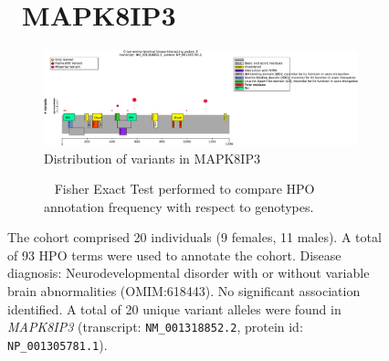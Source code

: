 \begin{figure}[htbp]
    \section*{ MAPK8IP3}
    \centering
    \begin{subfigure}[b]{0.95\textwidth}
    \centering
    \includegraphics[width=\textwidth]{ img/MAPK8IP3_protein_diagram.pdf} 
    \captionsetup{justification=raggedright,singlelinecheck=false}
    \caption{Distribution of variants in MAPK8IP3}
    \end{subfigure}
    
    \vspace{2em}
    
    \begin{subfigure}[b]{0.95\textwidth}
    \centering
    \captionsetup{justification=raggedright,singlelinecheck=false}
    \caption{             Fisher Exact Test performed to compare HPO annotation frequency with respect to genotypes. }
    \end{subfigure}
    
    \vspace{2em}
    
    \caption{ The cohort comprised 20 individuals (9 females, 11 males). A total of 93 HPO terms were used to annotate the cohort. Disease diagnosis: Neurodevelopmental disorder with or without variable brain abnormalities (OMIM:618443). No significant association identified. A total of 20 unique variant alleles were found in \textit{MAPK8IP3} (transcript: \texttt{NM\_001318852.2}, protein id: \texttt{NP\_001305781.1}).}
    \end{figure}
    
